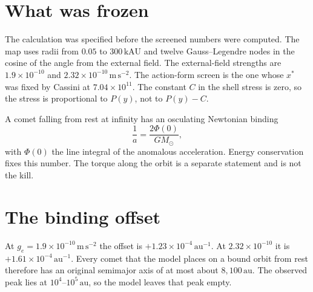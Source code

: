 \begin{abstract}
The tidal screen of the companion paper, with the Lagrangian constant set to zero, puts new comets on the wrong side of the observed Oort peak. A comet that falls in from rest arrives with a Newtonian \(1/a\) of about \(1.23\times10^{-4}\,\mathrm{au^{-1}}\), so its original semimajor axis is at most about \(8{,}100\,\mathrm{au}\). The observed peak of new comets lies between \(10^{4}\) and \(10^{5}\,\mathrm{au}\). The push sits in a shell near \(9\) to \(12\) thousand au, where the net gravity on a test body points outward. Three evaluations of the same map agree at the percent level. A radial orbit integration at the same \(C=0\) lands the same way: starts of \(3\times10^{4}\) and \(9.5\times10^{4}\,\mathrm{au}\) arrive at \(4{,}877\) and \(6{,}270\,\mathrm{au}\), and two starts inside the shell never reach the inner system. This paper records that null. It does not introduce a new constant.
\end{abstract}

\section{What was frozen}

The calculation was specified before the screened numbers were computed. The map uses radii from \(0.05\) to \(300\,\mathrm{kAU}\) and twelve Gauss--Legendre nodes in the cosine of the angle from the external field. The external-field strengths are \(1.9\times10^{-10}\) and \(2.32\times10^{-10}\,\mathrm{m\,s^{-2}}\). The action-form screen is the one whose \(x^*\) was fixed by Cassini at \(7.04\times10^{11}\). The constant \(C\) in the shell stress is zero, so the stress is proportional to \(P(y)\), not to \(P(y)-C\).

A comet falling from rest at infinity has an osculating Newtonian binding
\[
\frac{1}{a}=\frac{2\Phi(0)}{GM_\odot},
\]
with \(\Phi(0)\) the line integral of the anomalous acceleration. Energy conservation fixes this number. The torque along the orbit is a separate statement and is not the kill.

\section{The binding offset}

At \(g_e=1.9\times10^{-10}\,\mathrm{m\,s^{-2}}\) the offset is \(+1.23\times10^{-4}\,\mathrm{au^{-1}}\). At \(2.32\times10^{-10}\) it is \(+1.61\times10^{-4}\,\mathrm{au^{-1}}\). Every comet that the model places on a bound orbit from rest therefore has an original semimajor axis of at most about \(8{,}100\,\mathrm{au}\). The observed peak lies at \(10^{4}\)--\(10^{5}\,\mathrm{au}\), so the model leaves that peak empty.

